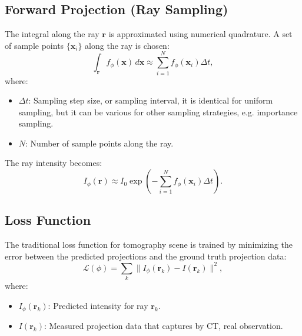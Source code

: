 \subsection{Forward Projection (Ray Sampling)}
The integral along the ray \( \mathbf{r} \) is approximated using numerical quadrature. A set of sample points \( \{\mathbf{x}_i\} \) along the ray is chosen:
\[
\int_{\mathbf{r}} f_\phi(\mathbf{x}) \, d\mathbf{x} \approx \sum_{i=1}^N f_\phi(\mathbf{x}_i) \Delta t,
\]
where:
\begin{itemize}
	\item \( \Delta t \): Sampling step size, or sampling interval, it is identical for uniform sampling, but it can be various for other sampling strategies, e.g. importance sampling.
	\item \( N \): Number of sample points along the ray.
\end{itemize}

The ray intensity becomes:
\[
I_\phi(\mathbf{r}) \approx I_0 \exp\left( -\sum_{i=1}^N f_\phi(\mathbf{x}_i) \Delta t \right).
\]

\subsection{Loss Function}
The traditional loss function for tomography scene is trained by minimizing the error between the predicted projections and the ground truth projection data:
\[
\mathcal{L}(\phi) = \sum_{k} \| I_\phi(\mathbf{r}_k) - I(\mathbf{r}_k) \|^2,
\]
where:
\begin{itemize}
	\item \( I_\phi(\mathbf{r}_k) \): Predicted intensity for ray \( \mathbf{r}_k \).
	\item \( I(\mathbf{r}_k) \): Measured projection data that captures by CT, real observation.
\end{itemize}

